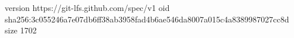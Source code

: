 version https://git-lfs.github.com/spec/v1
oid sha256:3c055246a7e07db6ff38ab3958fad4b6ae546da8007a015c4a8389987027cc8d
size 1702

